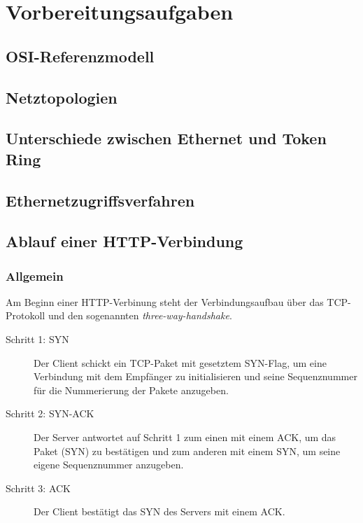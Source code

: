 \documentclass[11pt, a4paper]{article}
\begin{document}


\section{Vorbereitungsaufgaben}

\subsection{OSI-Referenzmodell}


\subsection{Netztopologien}


\pagebreak
\subsection{Unterschiede zwischen Ethernet und Token Ring}


\subsection{Ethernetzugriffsverfahren}\label{A4.4}


\subsection{Ablauf einer HTTP-Verbindung}
\subsubsection{Allgemein}\label{three_way}
Am Beginn einer HTTP-Verbinung steht der Verbindungsaufbau über das TCP-Protokoll und den sogenannten \emph{three-way-handshake}.
\begin{description}
\item[Schritt 1: SYN] Der Client schickt ein TCP-Paket mit gesetztem SYN-Flag, um eine Verbindung mit dem Empfänger zu initialisieren und seine Sequenznummer für die Nummerierung der Pakete anzugeben.
\item[Schritt 2: SYN-ACK] Der Server antwortet auf Schritt 1 zum einen mit einem ACK, um das Paket (SYN) zu bestätigen und zum anderen mit einem SYN, um seine eigene Sequenznummer anzugeben.
\item[Schritt 3: ACK] Der Client bestätigt das SYN des Servers mit einem ACK.
\end{description}
\end{document}

